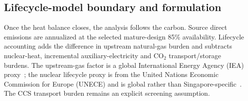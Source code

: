 \subsection{Lifecycle-model boundary and formulation}
Once the heat balance closes, the analysis follows the carbon. Source direct emissions are annualized at the selected mature-design 85\% availability. Lifecycle accounting adds the difference in upstream natural-gas burden and subtracts nuclear-heat, incremental auxiliary-electricity and CO$_2$ transport/storage burdens. The upstream-gas factor is a global International Energy Agency (IEA) proxy~\cite{iea2026lng}; the nuclear lifecycle proxy is from the United Nations Economic Commission for Europe (UNECE) and is global rather than Singapore-specific~\cite{unece2022lca}. The CCS transport burden remains an explicit screening assumption.

